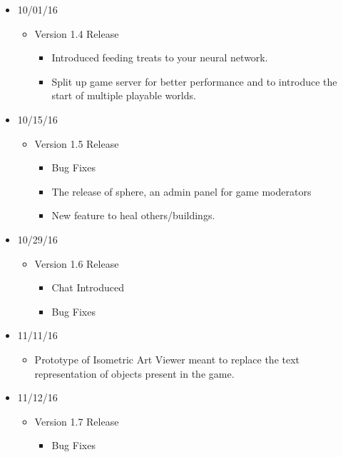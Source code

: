 \documentclass[11pt]{article}
\begin{document}
\begin{itemize}
	\item 10/01/16
		\begin{itemize}
			\item Version 1.4 Release
				\begin{itemize}
					\item Introduced feeding treats to your neural network.
					\item Split up game server for better performance and to introduce the start of multiple playable worlds.
				\end{itemize}
		\end{itemize}
	\item 10/15/16
		\begin{itemize}
			\item Version 1.5 Release
				\begin{itemize}
					\item Bug Fixes
					\item The release of sphere, an admin panel for game moderators
					\item New feature to heal others/buildings.
				\end{itemize}
		\end{itemize}
	\item 10/29/16
		\begin{itemize}
			\item Version 1.6 Release
				\begin{itemize}
					\item Chat Introduced
					\item Bug Fixes
				\end{itemize}
		\end{itemize}
	\item 11/11/16
		\begin{itemize}
			\item Prototype of Isometric Art Viewer meant to replace the text representation of objects present in the game.
		\end{itemize}
	\item 11/12/16
		\begin{itemize}
			\item Version 1.7 Release
				\begin{itemize}
					\item Bug Fixes
				\end{itemize}
		\end{itemize}
\end{itemize}
\end{document}
